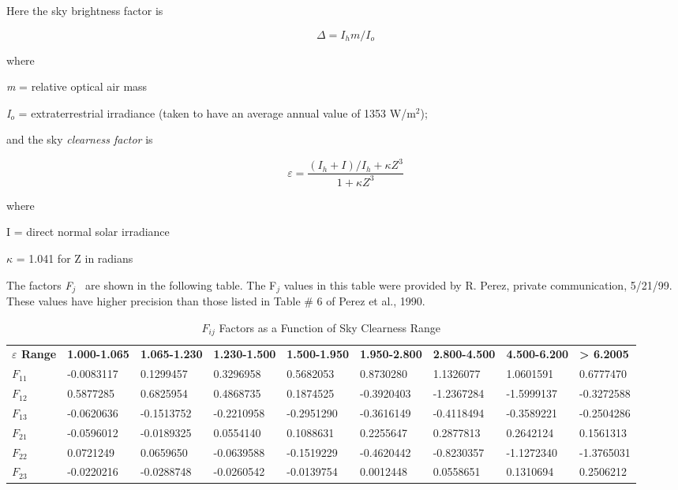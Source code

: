 Here the sky brightness factor is

\begin{equation}
\Delta  = {I_h}m/{I_o}
\end{equation}

where

\emph{m} = relative optical air mass

\emph{I\(_{o}\)} = extraterrestrial irradiance (taken to have an average annual value of 1353 W/m\(^{2}\));

and the sky \emph{clearness factor} is

\begin{equation}
\varepsilon  = \frac{{({I_h} + I)/{I_h} + \kappa {Z^3}}}{{1 + \kappa {Z^3}}}
\end{equation}

where

I = direct normal solar irradiance

$\kappa$ = 1.041 for Z in radians

The factors \emph{F\(_{j}\)} ~are shown in the following table. The F\(_{j}\) values in this table were provided by R. Perez, private communication, 5/21/99. These values have higher precision than those listed in Table \# 6 of Perez et al., 1990.

{\scriptsize
\begin{longtable}[c]{p{0.4in}p{0.6in}p{0.6in}p{0.6in}p{0.6in}p{0.6in}p{0.6in}p{0.6in}p{0.6in}}
\caption{$F_{ij}$ Factors as a Function of Sky Clearness Range \label{table:fij-factors-as-a-function-of-sky-clearness}}\\
\toprule 
\textbf{$\varepsilon$ Range} & \textbf{1.000-1.065} & \textbf{1.065-1.230} & \textbf{1.230-1.500} & \textbf{1.500-1.950} & \textbf{1.950-2.800} & \textbf{2.800-4.500} & \textbf{4.500-6.200} & \textbf{> 6.2005} \tabularnewline
\textbf{$F_{11}$} & -0.0083117 & 0.1299457 & 0.3296958 & 0.5682053 & 0.8730280 & 1.1326077 & 1.0601591 & 0.6777470 \tabularnewline
\textbf{$F_{12}$} & 0.5877285 & 0.6825954 & 0.4868735 & 0.1874525 & -0.3920403 & -1.2367284 & -1.5999137 & -0.3272588 \tabularnewline
\textbf{$F_{13}$} & -0.0620636 & -0.1513752 & -0.2210958 & -0.2951290 & -0.3616149 & -0.4118494 & -0.3589221 & -0.2504286 \tabularnewline
\textbf{$F_{21}$} & -0.0596012 & -0.0189325 & 0.0554140 & 0.1088631 & 0.2255647 & 0.2877813 & 0.2642124 & 0.1561313 \tabularnewline
\textbf{$F_{22}$} & 0.0721249 & 0.0659650 & -0.0639588 & -0.1519229 & -0.4620442 & -0.8230357 & -1.1272340 & -1.3765031 \tabularnewline
\textbf{$F_{23}$} & -0.0220216 & -0.0288748 & -0.0260542 & -0.0139754 & 0.0012448 & 0.0558651 & 0.1310694 & 0.2506212 \tabularnewline
\bottomrule
\end{longtable}}


